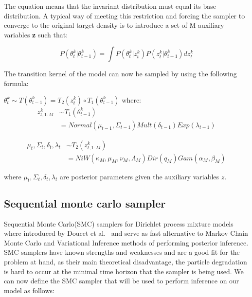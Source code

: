 \documentclass[twoside,hidelinks]{article}
\begin{document}
The equation means that the invariant distribution must equal its base distribution. A typical way of meeting this restriction and forcing the sampler to converge to the original target density\cite{smc:theory} is to introduce a set of M auxiliary variables \textbf{z} such that:

\begin{equation}
    P(\theta_t^k | \theta_{t-1}^k) =  \int P(\theta_t^k | z_{t}^k)   P(z_t^k| \theta_{t-1}^k) dz_t^k
\end{equation}

The transition kernel of the model can now be sampled by using the following formula:

$\theta_t^k \sim T(\theta_{t-1}^k) = T_2(z_t^k) \circ T_1(\theta_{t-1}^k)$ where:
\begin{equation} \label{eq1}
\begin{split}
    z_{t,1:M}^k  & \sim T_1(\theta_{t-1}^k)\\
 & = Normal(\mu_{t-1}, \Sigma_{t-1}) Mult( \delta_{t-1}) Exp( \lambda_{t-1})
\end{split}
\end{equation}

\begin{equation}
\begin{split}
    \mu_t, \Sigma_t, \delta_t,  \lambda_t & \sim T_2(z_{t,1:M}^k)\\
 & = NiW( \kappa_M, \mu_M, \nu_M, \Lambda_M ) Dir(q_M) Gam(\alpha_M, \beta_M) 
\end{split}
\end{equation}

where $\mu_t, \Sigma_t, \delta_t,  \lambda_t$  are posterior parameters given the auxiliary variables $z$.

\subsection{Sequential monte carlo sampler}
\label{smcsampler}
Sequential Monte Carlo(SMC) samplers for Dirichlet process mixture models where introduced by Doucet et al.~\cite{doucet} and serve as fast alternative to Markov Chain Monte Carlo and Variational Inference methods of performing posterior inference. SMC samplers have known strengths and weaknesses and are a good fit for the problem at hand, as their main theoretical disadvantage, the particle degradation is hard to occur at the minimal time horizon that the sampler is being used. We can now define the SMC sampler that will be used to perform inference on our model as follows:
\end{document}
